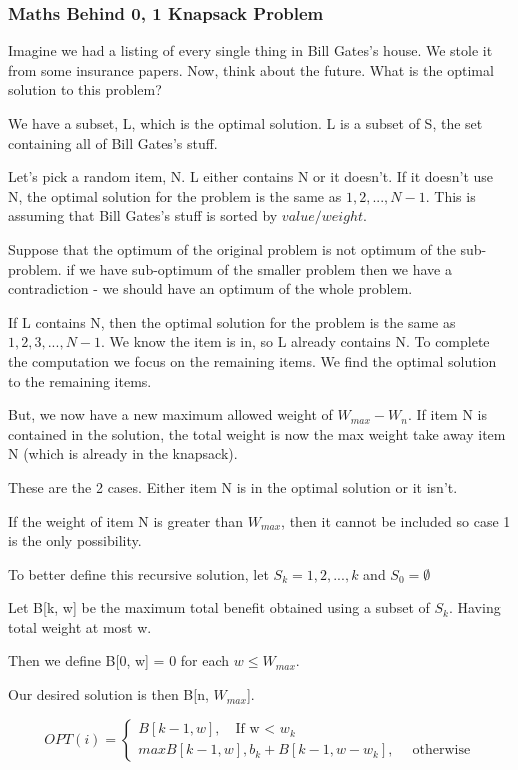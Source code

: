 \documentclass{article}
\begin{document}
\subsubsection{Maths Behind {0, 1} Knapsack Problem}
Imagine we had a listing of every single thing in Bill Gates's house. We stole it from some insurance papers. Now, think about the future. What is the optimal solution to this problem?

We have a subset, L, which is the optimal solution. L is a subset of S, the set containing all of Bill Gates's stuff.

Let's pick a random item, N. L either contains N or it doesn't. If it doesn't use N, the optimal solution for the problem is the same as ${1, 2, ..., N-1}$. This is assuming that Bill Gates's stuff is sorted by $value / weight$.

Suppose that the optimum of the original problem is not optimum of the sub-problem. if we have sub-optimum of the smaller problem then we have a contradiction - we should have an optimum of the whole problem.

If L contains N, then the optimal solution for the problem is the same as ${1, 2, 3, ..., N-1}$. We know the item is in, so L already contains N. To complete the computation we focus on the remaining items. We find the optimal solution to the remaining items.

But, we now have a new maximum allowed weight of $W_{max} - W_n$. If item N is contained in the solution, the total weight is now the max weight take away item N (which is already in the knapsack).

These are the 2 cases. Either item N is in the optimal solution or it isn't.

If the weight of item N is greater than $W_{max}$, then it cannot be included so case 1 is the only possibility.

To better define this recursive solution, let $S_k = {1, 2, ..., k}$ and $S_0 = \emptyset$

Let B[k, w] be the maximum total benefit obtained using a subset of $S_k$. Having total weight at most w.

Then we define B[0, w] = 0 for each $w \le W_{max}$.

Our desired solution is then B[n, $W_{max}$].

$$  OPT(i) = \begin{cases} B[k - 1, w], \quad \text{If w < }w_k \\ max{B[k-1, w], b_k + B[k - 1, w - w_k]}, \; \quad \text{otherwise} \end{cases}$$
\end{document}
